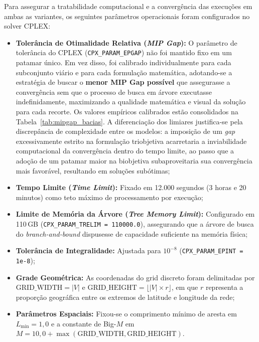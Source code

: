\documentclass[cic,tc]{infufrgs}
\begin{document}
Para assegurar a tratabilidade computacional e a convergência das execuções em ambas as variantes, os seguintes parâmetros operacionais foram configurados no solver CPLEX:
\begin{itemize}
    \item \textbf{Tolerância de Otimalidade Relativa (\textit{MIP Gap}):} O parâmetro de tolerância do CPLEX (\texttt{CPX\_\allowbreak PARAM\_\allowbreak EPGAP}) não foi mantido fixo em um patamar único. Em vez disso, foi calibrado individualmente para cada subconjunto viário e para cada formulação matemática, adotando-se a estratégia de buscar o \textbf{menor MIP Gap possível} que assegurasse a convergência sem que o processo de busca em árvore executasse indefinidamente, maximizando a qualidade matemática e visual da solução para cada recorte. Os valores empíricos calibrados estão consolidados na Tabela~\ref{tab:mipgap_bacias}. A diferenciação dos limiares justifica-se pela discrepância de complexidade entre os modelos: a imposição de um \textit{gap} excessivamente estrito na formulação triobjetiva acarretaria a inviabilidade computacional da convergência dentro do tempo limite, ao passo que a adoção de um patamar maior na biobjetiva subaproveitaria sua convergência mais favorável, resultando em soluções subótimas;
    \item \textbf{Tempo Limite (\textit{Time Limit}):} Fixado em 12.000 segundos (3 horas e 20 minutos) como teto máximo de processamento por execução;
    \item \textbf{Limite de Memória da Árvore (\textit{Tree Memory Limit}):} Configurado em 110\,GB (\texttt{CPX\_PARAM\_TRELIM = 110000.0}), assegurando que a árvore de busca do \textit{branch-and-bound} dispusesse de capacidade suficiente na memória física;
    \item \textbf{Tolerância de Integralidade:} Ajustada para $10^{-8}$ (\texttt{CPX\_PARAM\_EPINT = 1e-8});
    \item \textbf{Grade Geométrica:} As coordenadas do grid discreto foram delimitadas por $\text{GRID\_WIDTH} = |V|$ e $\text{GRID\_HEIGHT} = \lfloor |V| \times r \rfloor$, em que $r$ representa a proporção geográfica entre os extremos de latitude e longitude da rede;
    \item \textbf{Parâmetros Espaciais:} Fixou-se o comprimento mínimo de aresta em $L_{\min} = 1{,}0$ e a constante de Big-$M$ em $M = 10{,}0 + \max(\text{GRID\_WIDTH}, \text{GRID\_HEIGHT})$.
\end{itemize}
\end{document}
